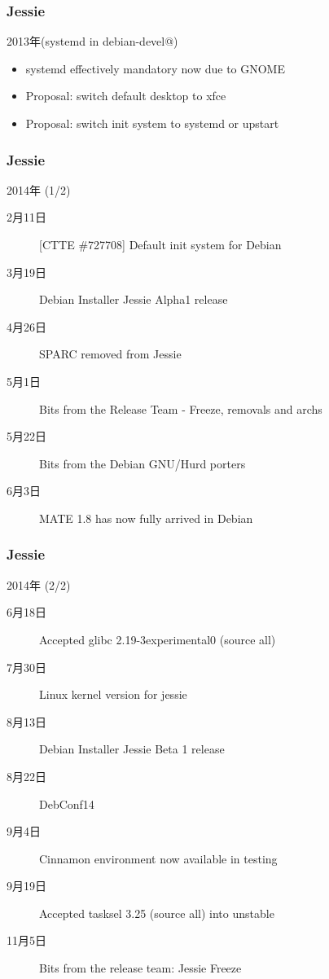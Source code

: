 \documentclass[cjk,dvipdfmx,10pt,compress,%
hyperref={bookmarks=true,bookmarksnumbered=true,bookmarksopen=false,%
colorlinks=false,%
pdftitle={第 97 回 関西 Debian 勉強会},%
pdfauthor={倉敷・のがた・佐々木・かわだ},%
pdfsubject={資料},%
}]{beamer}
\begin{document}
\begin{frame}
  \frametitle{ Jessie }
  \begin{block}{ 2013年(systemd in debian-devel@) }
    \begin{itemize}
    \item systemd effectively mandatory now due to GNOME
    \item Proposal: switch default desktop to xfce
    \item Proposal: switch init system to systemd or upstart
    \end{itemize}
  \end{block}
\end{frame}

\begin{frame}
  \frametitle{ Jessie }
  \begin{block}{2014年 (1/2)}
    \begin{description}
    \item[2月11日]
      [CTTE \#727708] Default init system for Debian
    \item[3月19日]
      Debian Installer Jessie Alpha1 release
    \item[4月26日]
      SPARC removed from Jessie
    \item[5月1日]
      Bits from the Release Team - Freeze, removals and archs
    \item[5月22日]
      Bits from the Debian GNU/Hurd porters
    \item[6月3日]
      MATE 1.8 has now fully arrived in Debian
    \end{description}
  \end{block}
\end{frame}

\begin{frame}
  \frametitle{ Jessie }
  \begin{block}{2014年 (2/2)}
    \begin{description}
    \item[6月18日]
      Accepted glibc 2.19-3experimental0 (source all)
    \item[7月30日]
      Linux kernel version for jessie
    \item[8月13日]
      Debian Installer Jessie Beta 1 release
    \item[8月22日]
      DebConf14
    \item[9月4日]
      Cinnamon environment now available in testing
    \item[9月19日]
      Accepted tasksel 3.25 (source all) into unstable
    \item[11月5日]
      Bits from the release team: Jessie Freeze
    \end{description}
  \end{block}
\end{frame}
\end{document}
